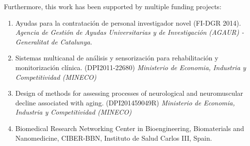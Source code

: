 Furthermore, this work has been supported by multiple funding projects:

\begin{enumerate}
\item Ayudas para la contratación de personal investigador novel (FI-DGR 2014). \emph{Agencia de Gestión de Ayudas Universitarias y de Investigación (AGAUR) - Generalitat de Catalunya.}

\item 	Sistemas multicanal de análisis y sensorización para rehabilitación y monitorización clínica. (DPI2011-22680) \emph{Ministerio de Economia, Industria y Competitividad (MINECO)}

\item 	Design of methods for assessing processes of neurological and neuromuscular decline associated with aging. (DPI201459049R) \emph{Ministerio de Economia, Industria y Competitividad (MINECO)}

\item	Biomedical Research Networking Center in Bioengineering, Biomaterials and Nanomedicine, CIBER-BBN, Instituto de Salud Carlos III, Spain.

\end{enumerate}
